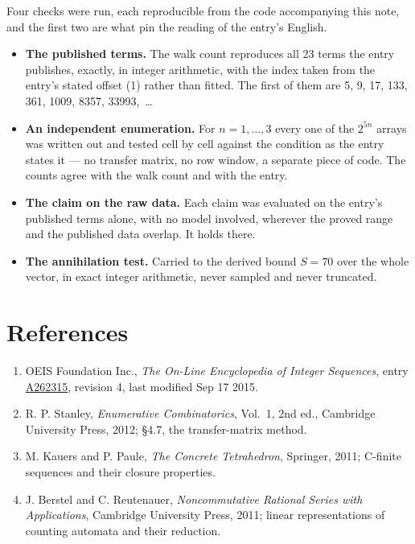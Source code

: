 \documentclass[11pt]{article}
\theoremstyle{definition}
\begin{document}
Four checks were run, each reproducible from the code accompanying this note, and the first two are what pin the reading of the entry's English.

\begin{itemize}

\item {\bfseries The published terms.} The walk count reproduces all 23 terms the entry publishes, exactly, in integer arithmetic, with the index taken from the entry's stated offset (1) rather than fitted. The first of them are 5, 9, 17, 133, 361, 1009, 8357, 33993,~\dots

\item {\bfseries An independent enumeration.} For $n = 1,\dots,3$ every one of the $2^{5n}$ arrays was written out and tested cell by cell against the condition as the entry states it --- no transfer matrix, no row window, a separate piece of code. The counts agree with the walk count and with the entry.

\item {\bfseries The claim on the raw data.} Each claim was evaluated on the entry's published terms alone, with no model involved, wherever the proved range and the published data overlap. It holds there.

\item {\bfseries The annihilation test.} Carried to the derived bound $S = 70$ over the whole vector, in exact integer arithmetic, never sampled and never truncated.

\end{itemize}

\section{References}

\begin{enumerate}

\item OEIS Foundation Inc., \emph{The On-Line Encyclopedia of Integer Sequences}, entry \href{https://oeis.org/A262315}{A262315}, revision 4, last modified Sep 17 2015.

\item R. P. Stanley, \emph{Enumerative Combinatorics}, Vol.~1, 2nd ed., Cambridge University Press, 2012; \S4.7, the transfer-matrix method.

\item M. Kauers and P. Paule, \emph{The Concrete Tetrahedron}, Springer, 2011; C-finite sequences and their closure properties.

\item J. Berstel and C. Reutenauer, \emph{Noncommutative Rational Series with Applications}, Cambridge University Press, 2011; linear representations of counting automata and their reduction.

\end{enumerate}
\end{document}
